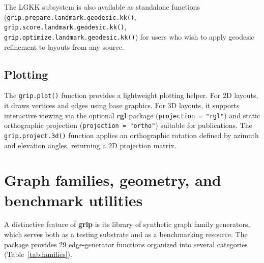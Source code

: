 The LGKK subsystem is also available as standalone functions
(\texttt{grip.prepare.landmark.geodesic.kk()},
\texttt{grip.score.landmark.geodesic.kk()},
\texttt{grip.optimize.landmark.geodesic.kk()}) for users who wish to
apply geodesic refinement to layouts from any source.

\subsection{Plotting}

The \texttt{grip.plot()} function provides a lightweight plotting helper.
For 2D layouts, it draws vertices and edges using base graphics. For 3D
layouts, it supports interactive viewing via the optional \textbf{rgl}
package (\texttt{projection = "rgl"}) and static orthographic projection
(\texttt{projection = "ortho"}) suitable for publications. The
\texttt{grip.project.3d()} function applies an orthographic rotation
defined by azimuth and elevation angles, returning a 2D projection
matrix.


\section{Graph families, geometry, and benchmark utilities}\label{sec:families}

A distinctive feature of \textbf{grip} is its library of synthetic graph
family generators, which serves both as a testing substrate and as a
benchmarking resource. The package provides 29 edge-generator functions
organized into several categories (Table~\ref{tab:families}).


